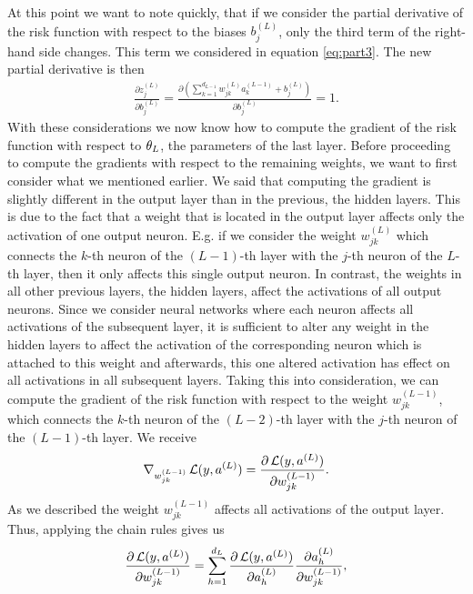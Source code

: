 At this point we want to note quickly, that if we consider the partial derivative of the risk function with respect to the biases $b_{j}^{(L)}$, only the third term of the right-hand side changes. This term we considered in equation \eqref{eq:part3}. The new partial derivative is then
\begin{align*}
\frac{\partial z_{j}^{(L)}}{\partial b^{(L)}_{j}} = \frac{\partial \left(\sum_{k=1}^{d_{L-1}} w^{(L)}_{jk} a_{k}^{(L-1)} + b_j^{(L)}\right)}{\partial b^{(L)}_{j}} = 1.
\end{align*}
With these considerations we now know how to compute the gradient of the risk function with respect to $\theta_L$, the parameters of the last layer. Before proceeding to compute the gradients with respect to the remaining weights, we want to first consider what we mentioned earlier. We said that computing the gradient is slightly different in the output layer than in the previous, the hidden layers. This is due to the fact that a weight that is located in the output layer affects only the activation of one output neuron. E.g. if we consider the weight $w_{jk}^{(L)}$ which connects the $k$-th neuron of the $(L-1)$-th layer with the $j$-th neuron of the $L$-th layer, then it only affects this single output neuron. In contrast, the weights in all other previous layers, the hidden layers, affect the activations of all output neurons. Since we consider neural networks where each neuron affects all activations of the subsequent layer, it is sufficient to alter any weight in the hidden layers to affect the activation of the corresponding neuron which is attached to this weight and afterwards, this one altered activation has effect on all activations in all subsequent layers. Taking this into consideration, we can compute the gradient of the risk function with respect to the weight $w_{jk}^{(L-1)}$, which connects the $k$-th neuron of the $(L-2)$-th layer with the $j$-th neuron of the $(L-1)$-th layer. We receive
\begin{align*}
\nabla_{w^{(L-1)}_{jk}} \operatorname{\mathcal{L}}(y, a^{(L)}) = \frac{\partial \operatorname{\mathcal{L}}(y, a^{(L)})}{\partial w^{(L-1)}_{jk}}.
\end{align*}
As we described the weight $w^{(L-1)}_{jk}$ affects all activations of the output layer. Thus, applying the chain rules gives us
\begin{align*}
\frac{\partial \operatorname{\mathcal{L}}(y, a^{(L)})}{\partial w^{(L-1)}_{jk}} = \sum_{h=1}^{d_L}\frac{\partial \operatorname{\mathcal{L}}(y, a^{(L)})}{\partial a_h^{(L)}} \frac{\partial a_h^{(L)}}{\partial w^{(L-1)}_{jk}},
\end{align*}
